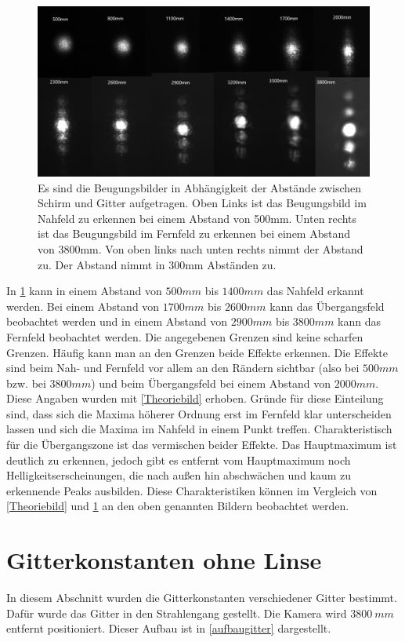 \begin{figure}[h!]
	\centering
	\includegraphics[scale = 0.65]{alleabstande.png}
	\caption{Es sind die Beugungsbilder in Abhängigkeit der Abstände zwischen Schirm und Gitter aufgetragen. Oben Links ist das Beugungsbild im Nahfeld zu erkennen bei einem Abstand von 500mm. Unten rechts ist das Beugungsbild im Fernfeld zu erkennen bei einem Abstand von 3800mm. Von oben links nach unten rechts nimmt der Abstand zu. Der Abstand nimmt in 300mm Abständen zu.}
	\label{alle}
\end{figure}
In \cref{alle} kann in einem Abstand von $500 mm$ bis $1400 mm$ das Nahfeld erkannt werden. Bei einem Abstand von $1700 mm$ bis $2600 mm$  kann das Übergangsfeld beobachtet werden und in einem Abstand von $2900 mm$ bis $3800 mm$ kann das Fernfeld beobachtet werden. Die angegebenen Grenzen sind keine scharfen Grenzen. Häufig kann man an den Grenzen beide Effekte erkennen. Die Effekte sind beim Nah- und Fernfeld vor allem an den Rändern sichtbar (also bei $500 mm$ bzw. bei $3800 mm$) und beim Übergangsfeld bei einem Abstand von $2000 mm$. Diese Angaben wurden mit \cref{Theoriebild} erhoben. Gründe für diese Einteilung sind, dass sich die Maxima höherer Ordnung erst im Fernfeld klar unterscheiden lassen und sich die Maxima im Nahfeld in einem Punkt treffen. Charakteristisch für die Übergangszone ist das vermischen beider Effekte. Das Hauptmaximum ist deutlich zu erkennen, jedoch gibt es entfernt vom Hauptmaximum noch Helligkeitserscheinungen, die nach außen hin abschwächen und kaum zu erkennende Peaks ausbilden. Diese Charakteristiken können im Vergleich von \cref{Theoriebild} und \cref{alle} an den oben genannten Bildern beobachtet werden.


\section{Gitterkonstanten ohne Linse}
In diesem Abschnitt wurden die Gitterkonstanten verschiedener Gitter bestimmt. Dafür wurde das Gitter in den Strahlengang gestellt. Die Kamera wird $\SI{3800}{mm}$ entfernt positioniert. Dieser Aufbau ist in \cref{aufbaugitter} dargestellt.

